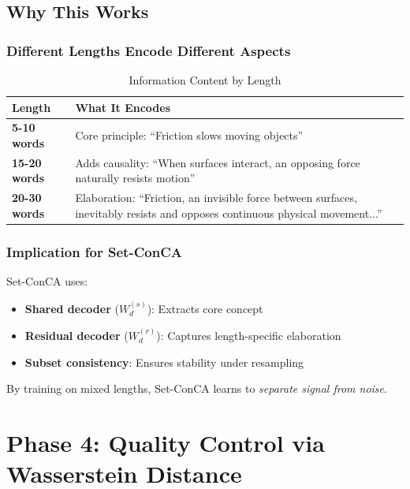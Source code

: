 \documentclass[12pt,a4paper]{report}
\begin{document}
\section{Why This Works}

\subsection{Different Lengths Encode Different Aspects}

\begin{table}[H]
\centering
\begin{tabular}{p{3cm}p{8cm}}
\toprule
\textbf{Length} & \textbf{What It Encodes} \\
\midrule
\textbf{5-10 words} & Core principle: ``Friction slows moving objects'' \\
\textbf{15-20 words} & Adds causality: ``When surfaces interact, an opposing force naturally resists motion'' \\
\textbf{20-30 words} & Elaboration: ``Friction, an invisible force between surfaces, inevitably resists and opposes continuous physical movement...'' \\
\bottomrule
\end{tabular}
\caption{Information Content by Length}
\end{table}

\subsection{Implication for Set-ConCA}

Set-ConCA uses:
\begin{itemize}
    \item \textbf{Shared decoder} ($W^{(s)}_d$): Extracts core concept
    \item \textbf{Residual decoder} ($W^{(r)}_d$): Captures length-specific elaboration
    \item \textbf{Subset consistency}: Ensures stability under resampling
\end{itemize}

\vspace{0.3cm}
By training on mixed lengths, Set-ConCA learns to \textit{separate signal from noise}.

\newpage

\chapter{Phase 4: Quality Control via Wasserstein Distance}
\end{document}
